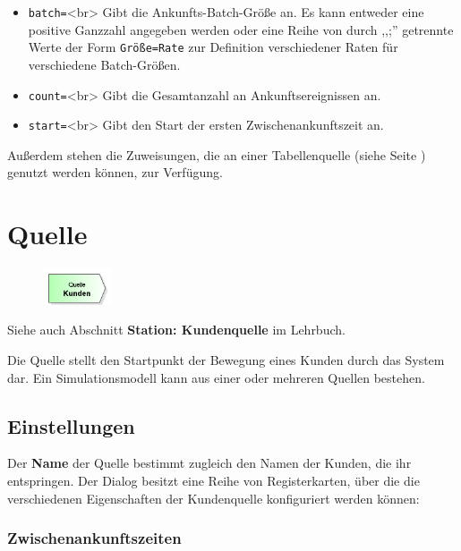 \begin{itemize}
  \item \texttt{batch=}<br>
  Gibt die Ankunfts-Batch-Größe an. Es kann entweder eine positive Ganzzahl angegeben werden oder eine Reihe von
  durch ,,;'' getrennte Werte der Form \texttt{Größe=Rate} zur Definition verschiedener Raten für verschiedene Batch-Größen. 
  \item \texttt{count=}<br>
  Gibt die Gesamtanzahl an Ankunftsereignissen an. 
  \item \texttt{start=}<br>
  Gibt den Start der ersten Zwischenankunftszeit an. 
\end{itemize}

Außerdem stehen die Zuweisungen, die an einer Tabellenquelle (siehe Seite \pageref{ref:ModelElementSourceTable}) genutzt werden können, zur Verfügung.


\section{Quelle}
\label{ref:ModelElementSource}

\begin{figure}
\vspace{-22pt}
\includegraphics[width=2cm]{imageModelElementSource.png}
\vspace{-22pt}
\end{figure}

Siehe auch Abschnitt \textbf{Station: Kundenquelle} im Lehrbuch.

Die Quelle stellt den Startpunkt der Bewegung eines Kunden durch das System dar.
Ein Simulationsmodell kann aus einer oder mehreren Quellen bestehen.

\subsection*{Einstellungen}

Der \textbf{Name} der Quelle bestimmt zugleich den Namen der Kunden, die ihr entspringen.
Der Dialog besitzt eine Reihe von Registerkarten, über die die verschiedenen Eigenschaften
der Kundenquelle konfiguriert werden können:

\subsubsection*{Zwischenankunftszeiten}

